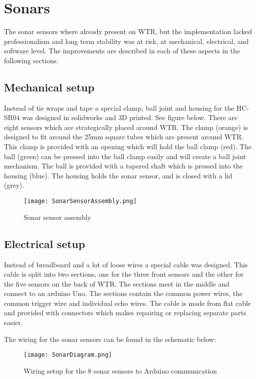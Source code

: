 \section{Sonars}
The sonar sensors where already present on WTR, but the implementation lacked professionalism and long term stability was at risk, at mechanical, electrical, and software level.
The improvements are described in each of these aspects in the following sections.

\subsection{Mechanical setup}
Instead of tie wraps and tape a special clamp, ball joint and housing for the HC-SR04 was designed in solidworks and 3D printed. See figure below.
There are eight sensors which are strategically placed around WTR.
The clamp (orange) is designed to fit around the 25mm square tubes which are present around WTR. 
This clamp is provided with an opening which will hold the ball clamp (red).
The ball (green) can be pressed into the ball clamp easily and will create a ball joint mechanism.
The ball is provided with a tapered shaft which is pressed into the housing (blue).
The housing holds the sonar sensor, and is closed with a lid (grey).

\begin{figure}[H]
\centering
\texttt{[image: SonarSensorAssembly.png]}
\caption{Sonar sensor assembly}
\label{fig::sonarassembly}
\end{figure}


\subsection{Electrical setup}
Instead of breadboard and a lot of loose wires a special cable was designed. 
This cable is split into two sections, one for the three front sensors and the other for the five sensors on the back of WTR.
The sections meet in the middle and connect to an arduino Uno.
The sections contain the common power wires, the common trigger wire and individual echo wires.
The cable is made from flat cable and provided with connectors which makes repairing or replacing separate parts easier.

The wiring for the sonar sensors can be found in the schematic below:

\begin{figure}[H]
\centering
\texttt{[image: SonarDiagram.png]}
\caption{Wiring setup for the 8 sonar sensors to Arduino communication}
\label{fig::wiringsonar}
\end{figure}

 
    
